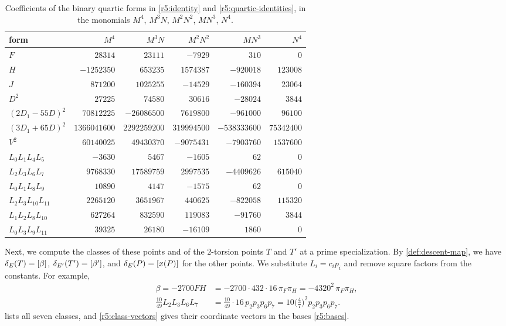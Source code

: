 \begin{table}[htbp]
\centering
\caption{Coefficients of the binary quartic forms in \eqref{r5:identity} and \eqref{r5:quartic-identities}, in the monomials $M^4$, $M^3N$, $M^2N^2$, $MN^3$, $N^4$.}\label{tab:r5-quartics}
\small
\begin{tabular}{lrrrrr}
\toprule
form & $M^4$ & $M^3N$ & $M^2N^2$ & $MN^3$ & $N^4$\\
\midrule
$F$ & $28314$ & $23111$ & $-7929$ & $310$ & $0$\\
$H$ & $-1252350$ & $653235$ & $1574387$ & $-920018$ & $123008$\\
$J$ & $871200$ & $1025255$ & $-14529$ & $-160394$ & $23064$\\
\midrule
$D^2$ & $27225$ & $74580$ & $30616$ & $-28024$ & $3844$\\
$(2D_1-55D)^2$ & $70812225$ & $-26086500$ & $7619800$ & $-961000$ & $96100$\\
$(3D_1+65D)^2$ & $1366041600$ & $2292259200$ & $319994500$ & $-538333600$ & $75342400$\\
$V^2$ & $60140025$ & $49430370$ & $-9075431$ & $-7903760$ & $1537600$\\
\midrule
$L_0L_1L_4L_5$ & $-3630$ & $5467$ & $-1605$ & $62$ & $0$\\
$L_2L_3L_6L_7$ & $9768330$ & $17589759$ & $2997535$ & $-4409626$ & $615040$\\
$L_0L_1L_8L_9$ & $10890$ & $4147$ & $-1575$ & $62$ & $0$\\
$L_2L_3L_{10}L_{11}$ & $2265120$ & $3651967$ & $440625$ & $-822058$ & $115320$\\
$L_1L_2L_8L_{10}$ & $627264$ & $832590$ & $119083$ & $-91760$ & $3844$\\
$L_0L_3L_9L_{11}$ & $39325$ & $26180$ & $-16109$ & $1860$ & $0$\\
\bottomrule
\end{tabular}
\end{table}

Next, we compute the classes of these points and of the $2$-torsion points $T$ and $T'$ at a prime specialization. By \cref{def:descent-map}, we have $\delta_E(T)=[\beta]$, $\delta_{E'}(T')=[\beta']$, and $\delta_E(P)=[x(P)]$ for the other points. We substitute $L_i=c_ip_i$ and remove square factors from the constants. For example,
\[
\begin{aligned}
\beta=-2700FH&=-2700\cdot432\cdot16\,\pi_F\pi_H=-4320^2\,\pi_F\pi_H,\\
\tfrac{10}{49}L_2L_3L_6L_7&=\tfrac{10}{49}\cdot16\,p_2p_3p_6p_7=10\big(\tfrac47\big)^2p_2p_3p_6p_7.
\end{aligned}
\]
 lists all seven classes, and \eqref{r5:class-vectors} gives their coordinate vectors in the bases \eqref{r5:bases}.

